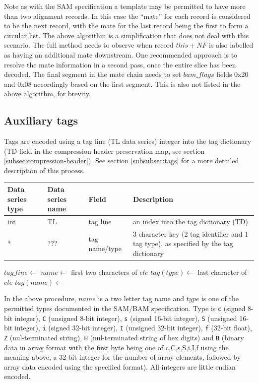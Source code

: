 \documentclass[a4paper]{article}
\begin{document}
Note as with the SAM specification a template may be permitted to have more than two alignment records.
In this case the ``mate'' for each record is considered to be the next record, with the mate for the last record being the first to form a circular list.
The above algorithm is a simplification that does not deal with this scenario.
The full method needs to observe when record $this+NF$ is also labelled as having an additional mate downstream.
One recommended approach is to resolve the mate information in a second pass, once the entire slice has been decoded.
The final segment in the mate chain needs to set $bam\_flags$ fields 0x20 and 0x08 accordingly based on the first segment.
This is also not listed in the above algorithm, for brevity.

\subsection{Auxiliary tags}
\label{subsec:tags}

Tags are encoded using a tag line (TL data series) integer into the tag dictionary (TD field in the compression header preservation map, see section \ref{subsec:compression-header}).
See section \ref{subsubsec:tags} for a more detailed description of this process.

\begin{tabular}{|>{\raggedright}p{70pt}|>{\raggedright}p{75pt}|>{\raggedright}p{90pt}|>{\raggedright}p{200pt}|}
\hline
\textbf{Data series type} & \textbf{Data series name} & \textbf{Field} & \textbf{Description}\tabularnewline
\hline
int & TL & tag line & an index into the tag dictionary (TD)\tabularnewline
\hline
* & ??? & tag name/type & 3 character key (2 tag identifier and 1 tag type), as specified by the tag dictionary\tabularnewline
\hline
\end{tabular}

\vskip 20pt
\begin{algorithmic}[1]
\State $tag\_line\gets$ 
  \State $name\gets$ first two characters of $ele$
  \State $tag(type)\gets$ last character of $ele$
  \State $tag(name)\gets$ 
\EndFor
\EndProcedure
\end{algorithmic}

In the above procedure, $name$ is a two letter tag name and $type$ is one of the permitted types documented in the SAM/BAM specification.
Type is \texttt{c} (signed 8-bit integer), \texttt{C} (unsigned 8-bit integer), \texttt{s} (signed 16-bit integer), \texttt{S} (unsigned 16-bit integer), \texttt{i} (signed 32-bit integer), \texttt{I} (unsigned 32-bit integer), \texttt{f} (32-bit float), \texttt{Z} (nul-terminated string), \texttt{H} (nul-terminated string of hex digits) and \texttt{B} (binary data in array format with the first byte being one of c,C,s,S,i,I,f using the meaning above, a 32-bit integer for the number of array elements, followed by array data encoded using the specified format).  All integers are little endian encoded.
\end{document}
